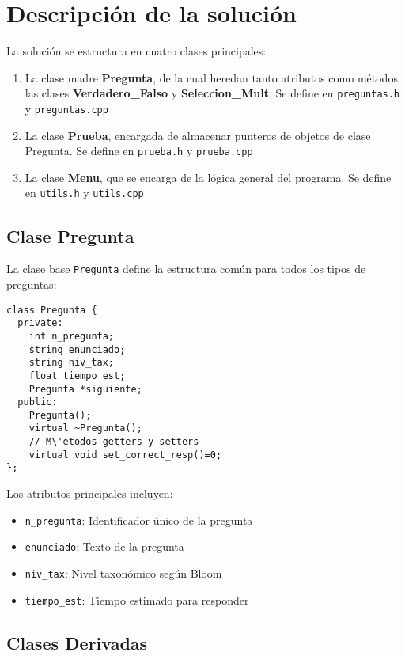 \documentclass[12pt]{article}
\begin{document}
\section{Descripci\'on de la soluci\'on}
La soluci\'on se estructura en cuatro clases principales:
\begin{enumerate}
    \item La clase madre \textbf{Pregunta}, de la cual heredan tanto atributos como m\'etodos las clases \textbf{Verdadero\_Falso} y \textbf{Seleccion\_Mult}. Se define en \texttt{preguntas.h} y \texttt{preguntas.cpp}
    \item La clase \textbf{Prueba}, encargada de almacenar punteros de objetos de clase Pregunta. Se define en \texttt{prueba.h} y \texttt{prueba.cpp}
    \item La clase \textbf{Menu}, que se encarga de la l\'ogica general del programa. Se define en \texttt{utils.h} y \texttt{utils.cpp}
\end{enumerate}

\subsection{Clase Pregunta}
La clase base \texttt{Pregunta} define la estructura com\'un para todos los tipos de preguntas:

\begin{lstlisting}[style=customc]
class Pregunta {
  private:
    int n_pregunta;
    string enunciado;
    string niv_tax;
    float tiempo_est;
    Pregunta *siguiente;
  public:
    Pregunta();
    virtual ~Pregunta();
    // M\'etodos getters y setters
    virtual void set_correct_resp()=0;
};
\end{lstlisting}

Los atributos principales incluyen:
\begin{itemize}
    \item \texttt{n\_pregunta}: Identificador \'unico de la pregunta
    \item \texttt{enunciado}: Texto de la pregunta
    \item \texttt{niv\_tax}: Nivel taxon\'omico seg\'un Bloom
    \item \texttt{tiempo\_est}: Tiempo estimado para responder
\end{itemize}

\subsection{Clases Derivadas}
\end{document}
